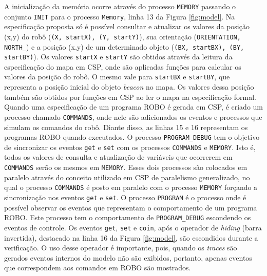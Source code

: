 A inicialização da memória ocorre através do processo \texttt{MEMORY} passando o conjunto \texttt{INIT} para o processo \texttt{Memory}, linha 13 da Figura \ref{fig:model}. Na especificação proposta só é possível consultar e atualizar os valores da posição (x,y) do robô (\texttt{(X, startX), (Y, startY)}), sua orientação (\texttt{ORIENTATION, NORTH\_}) e a posição (x,y) de um determinado objeto (\texttt{(BX, startBX), (BY, startBY)}). Os valores \texttt{startX} e \texttt{startY} são obtidos através da leitura da especificação do mapa em CSP, onde são aplicadas funções para calcular os valores da posição do robô. O mesmo vale para \texttt{startBX} e \texttt{startBY}, que representa a posição inicial do objeto \textit{beacon} no mapa. Os valores dessa posição também são obtidos por funções em CSP ao ler o mapa na especificação formal. Quando uma especificação de um programa ROBO é gerada em CSP, é criado um processo chamado \texttt{COMMANDS}, onde nele são adicionados os eventos e processos que simulam os comandos do robô. Diante disso, as linhas 15 e 16 representam os programas ROBO quando executados. O processo \texttt{PROGRAM\_DEBUG} tem o objetivo de sincronizar os eventos \texttt{get} e \texttt{set} com os processos \texttt{COMMANDS} e \texttt{MEMORY}. Isto é, todos os valores de consulta e atualização de variáveis que ocorrerem em \texttt{COMMANDS} serão os mesmos em \texttt{MEMORY}. Esses dois processos são colocados em paralelo através do conceito utilizado em CSP de paralelismo generalizado, no qual o processo \texttt{COMMANDS} é posto em paralelo com o processo \texttt{MEMORY} forçando a sincronização nos eventos \texttt{get} e \texttt{set}. O processo \texttt{PROGRAM} é o processo onde é possível observar os eventos que representam o comportamento de um programa ROBO. Este processo tem o comportamento de \texttt{PROGRAM\_DEBUG} escondendo os eventos de controle. Os eventos \texttt{get}, \texttt{set} e \texttt{coin}, após o operador de \textit{hiding} (barra invertida), destacado na linha 16 da Figura \ref{fig:model}, são escondidos durante a verificação. O uso desse operador é importante, pois, quando os \textit{traces} são gerados eventos internos do modelo não são exibidos, portanto, apenas eventos que correspondem aos comandos em ROBO são mostrados.

